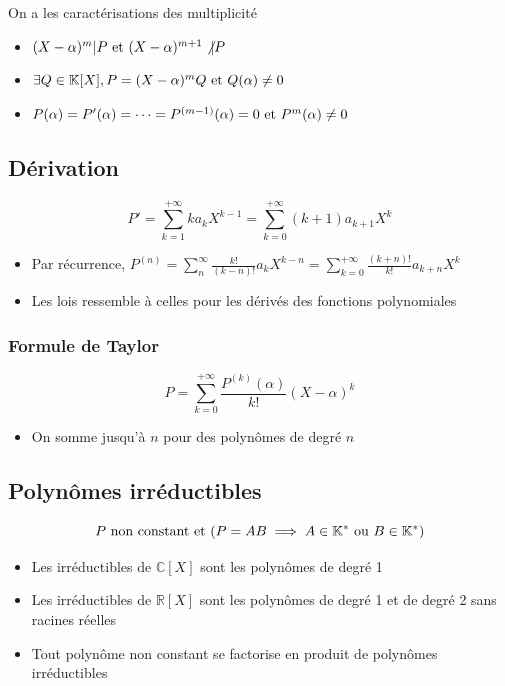 \documentclass[openany]{book}
\begin{document}
\noindent On a les caractérisations des multiplicité
\begin{itemize}
    \item $(X-\alpha)^m | P \text{ et } (X-\alpha)^{m+1} \not | P $
    \item $ \exists Q \in \mathbb{K}[X], P = (X-\alpha)^m Q \text{ et } Q(\alpha) \neq 0 $
    \item $ P(\alpha) = P'(\alpha) = \dots = P^{(m-1)}(\alpha) = 0 \text{ et } P^{m}(\alpha) \neq 0 $ 
\end{itemize}

\subsection{Dérivation}
\[ P' = \sum_{k=1}^{+\infty}ka_kX^{k-1} = \sum_{k=0}^{+\infty}(k+1)a_{k+1}X^k \]

\begin{itemize}
    \item Par récurrence, $P^{(n)} = \sum_{n}^{\infty} \frac{k!}{(k-n)!} a_k X^{k-n} = \sum_{k=0}^{+\infty} \frac{(k+n)!}{k!}a_{k+n} X^k $
    \item Les lois ressemble à celles pour les dérivés des fonctions polynomiales
\end{itemize}

\subsubsection{Formule de Taylor}
\[ P = \sum_{k=0}^{+\infty} \frac{P^{(k)}(\alpha)}{k!}(X-\alpha)^k \]

\begin{itemize}
    \item On somme jusqu'à $n$ pour des polynômes de degré $n$
\end{itemize}

\subsection{Polynômes irréductibles}
\[ P \text{ non constant et } (P = AB \implies A \in \mathbb{K}^* \text{ ou } B \in \mathbb{K}^*) \]

\begin{itemize}
    \item Les irréductibles de $\mathbb{C}[X]$ sont les polynômes de degré 1 
    \item Les irréductibles de $\mathbb{R}[X]$ sont les polynômes de degré 1 et de degré 2 sans racines réelles 
    \item Tout polynôme non constant se factorise en produit de polynômes irréductibles
\end{itemize}
\end{document}
